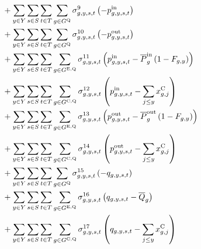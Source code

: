 \documentclass{article}
\begin{document}
\begin{align}
	& + \sum\limits_{\iYear \in \sYears}\sum\limits_{\iScenario \in \sScenarios}\sum\limits_{\iInterval \in \sIntervals} \sum\limits_{\iGenerator \in \sStorage} \dNonNegativeCharging \left(-\vPowerIn\right) \nonumber\\
	& + \sum\limits_{\iYear \in \sYears}\sum\limits_{\iScenario \in \sScenarios}\sum\limits_{\iInterval \in \sIntervals} \sum\limits_{\iGenerator \in \sStorage} \dNonNegativeDischarging \left(-\vPowerOut\right) \nonumber\\
	& + \sum\limits_{\iYear \in \sYears}\sum\limits_{\iScenario \in \sScenarios}\sum\limits_{\iInterval \in \sIntervals} \sum\limits_{\iGenerator \in \sStorageExisting} \dMaxChargingRateExisting \left(\vPowerIn - \cPowerChargingMax \left(1 - \cRetirementIndicator\right) \right)\nonumber\\
	& + \sum\limits_{\iYear \in \sYears}\sum\limits_{\iScenario \in \sScenarios}\sum\limits_{\iInterval \in \sIntervals} \sum\limits_{\iGenerator \in \sStorageCandidate} \dMaxChargingRateCandidate \left(\vPowerIn - \sum\limits_{\iYearAlias \leq \iYear} \vInstalledCapacity[\iGenerator,\iYearAlias]\right)\nonumber\\
	& + \sum\limits_{\iYear \in \sYears}\sum\limits_{\iScenario \in \sScenarios}\sum\limits_{\iInterval \in \sIntervals} \sum\limits_{\iGenerator \in \sStorageExisting} \dMaxDischargingRateExisting \left(\vPowerOut - \cPowerDischargingMax \left(1 - \cRetirementIndicator\right)\right)\nonumber\\
	& + \sum\limits_{\iYear \in \sYears}\sum\limits_{\iScenario \in \sScenarios}\sum\limits_{\iInterval \in \sIntervals} \sum\limits_{\iGenerator \in \sStorageCandidate} \dMaxDischargingRateCandidate \left(\vPowerOut - \sum\limits_{\iYearAlias \leq \iYear} \vInstalledCapacity[\iGenerator,\iYearAlias]\right)\nonumber\\
	& + \sum\limits_{\iYear \in \sYears}\sum\limits_{\iScenario \in \sScenarios}\sum\limits_{\iInterval \in \sIntervals} \sum\limits_{\iGenerator \in \sStorage} \dNonNegativeStorageEnergy \left(- \vStorageUnitEnergy\right)\nonumber\\
	& + \sum\limits_{\iYear \in \sYears}\sum\limits_{\iScenario \in \sScenarios}\sum\limits_{\iInterval \in \sIntervals} \sum\limits_{\iGenerator \in \sStorageExisting} \dMaxStorageEnergyExisting \left(\vStorageUnitEnergy - \cStorageUnitEnergyMax\right)\nonumber\\
	& + \sum\limits_{\iYear \in \sYears}\sum\limits_{\iScenario \in \sScenarios}\sum\limits_{\iInterval \in \sIntervals} \sum\limits_{\iGenerator \in \sStorageCandidate} \dMaxStorageEnergyCandidate \left(\vStorageUnitEnergy - \sum\limits_{\iYearAlias \leq \iYear} \vInstalledCapacity[\iGenerator,\iYearAlias]\right)\nonumber\\

\end{align}
\end{document}

